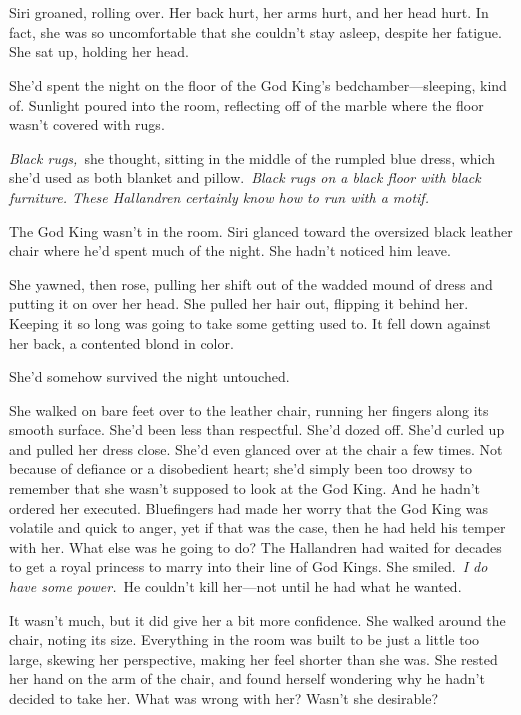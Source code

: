 \chapter{}

Siri groaned, rolling over. Her back hurt, her arms hurt, and her head hurt. In fact, she was so uncomfortable that she couldn’t stay asleep, despite her fatigue. She sat up, holding her head.

She’d spent the night on the floor of the God King’s bedchamber—sleeping, kind of. Sunlight poured into the room, reflecting off of the marble where the floor wasn’t covered with rugs.

\textit{Black rugs,}~she thought, sitting in the middle of the rumpled blue dress, which she’d used as both blanket and pillow.~\textit{Black rugs on a black floor with black furniture. These Hallandren certainly know how to run with a motif.}

The God King wasn’t in the room. Siri glanced toward the oversized black leather chair where he’d spent much of the night. She hadn’t noticed him leave.

She yawned, then rose, pulling her shift out of the wadded mound of dress and putting it on over her head. She pulled her hair out, flipping it behind her. Keeping it so long was going to take some getting used to. It fell down against her back, a contented blond in color.

She’d somehow survived the night untouched.

She walked on bare feet over to the leather chair, running her fingers along its smooth surface. She’d been less than respectful. She’d dozed off. She’d curled up and pulled her dress close. She’d even glanced over at the chair a few times. Not because of defiance or a disobedient heart; she’d simply been too drowsy to remember that she wasn’t supposed to look at the God King. And he hadn’t ordered her executed. Bluefingers had made her worry that the God King was volatile and quick to anger, yet if that was the case, then he had held his temper with her. What else was he going to do? The Hallandren had waited for decades to get a royal princess to marry into their line of God Kings. She smiled.~\textit{I do have some power.}~He couldn’t kill her—not until he had what he wanted.

It wasn’t much, but it did give her a bit more confidence. She walked around the chair, noting its size. Everything in the room was built to be just a little too large, skewing her perspective, making her feel shorter than she was. She rested her hand on the arm of the chair, and found herself wondering why he hadn’t decided to take her. What was wrong with her? Wasn’t she desirable?

